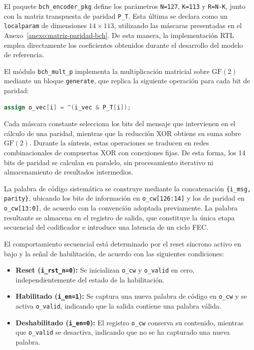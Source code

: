 \documentclass[10pt,a4paper]{article}
\begin{document}
El paquete \texttt{bch\_encoder\_pkg} define los parámetros
\texttt{N=127}, \texttt{K=113} y \texttt{R=N-K}, junto con la
matriz transpuesta de paridad \texttt{P\_T}. Esta última se declara
como un \texttt{localparam} de dimensiones $14\times113$,
utilizando las máscaras presentadas en el
Anexo~\ref{anexo:matriz-paridad-bch}. De esta manera, la
implementación RTL emplea directamente los coeficientes
obtenidos durante el desarrollo del modelo de referencia.

El módulo \texttt{bch\_mult\_p} implementa la multiplicación
matricial sobre $\mathrm{GF}(2)$ mediante un bloque
\texttt{generate}, que replica la siguiente operación para
cada bit de paridad:

\begin{lstlisting}[language=Verilog]
assign o_vec[i] = ^(i_vec & P_T[i]);
\end{lstlisting}

Cada máscara constante selecciona los bits del mensaje que
intervienen en el cálculo de una paridad, mientras que la
reducción XOR obtiene su suma sobre $\mathrm{GF}(2)$.
Durante la síntesis, estas operaciones se traducen en redes
combinacionales de compuertas XOR con conexiones fijas.
De esta forma, los 14 bits de paridad se calculan en paralelo,
sin procesamiento iterativo ni almacenamiento de resultados
intermedios.

La palabra de código sistemática se construye mediante
la concatenación \texttt{\{i\_msg, parity\}}, ubicando los
bits de información en \texttt{o\_cw[126:14]} y los de
paridad en \texttt{o\_cw[13:0]}, de acuerdo con la convención
adoptada previamente. La palabra resultante se almacena en
el registro de salida, que constituye la única etapa secuencial
del codificador e introduce una latencia de un ciclo FEC.

El comportamiento secuencial está determinado por el reset
síncrono activo en bajo y la señal de habilitación, de acuerdo
con las siguientes condiciones:

\begin{itemize}
    \item \textbf{Reset (\texttt{i\_rst\_n=0}):}
    Se inicializan \texttt{o\_cw} y \texttt{o\_valid} en cero,
    independientemente del estado de la habilitación.

    \item \textbf{Habilitado (\texttt{i\_en=1}):}
    Se captura una nueva palabra de código en \texttt{o\_cw}
    y se activa \texttt{o\_valid}, indicando que la salida
    contiene una palabra válida.

    \item \textbf{Deshabilitado (\texttt{i\_en=0}):}
    El registro \texttt{o\_cw} conserva su contenido,
    mientras que \texttt{o\_valid} se desactiva, indicando
    que no se ha capturado una nueva palabra.
\end{itemize}
\end{document}
